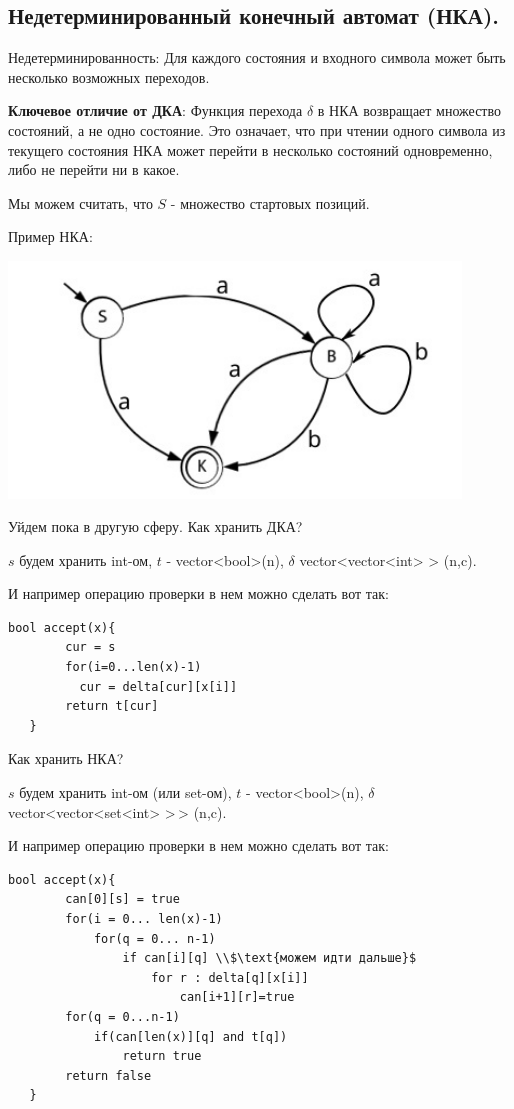 \subsection{Недетерминированный конечный автомат (НКА).}

Недетерминированность: Для каждого состояния и входного символа может быть несколько возможных переходов.

\textbf{Ключевое отличие от ДКА}: Функция перехода $\delta$ в НКА возвращает множество состояний, а не одно состояние. Это означает, что при чтении одного символа из текущего состояния НКА может перейти в несколько состояний одновременно, либо не перейти ни в какое.

Мы можем считать, что $S$ - множество стартовых позиций.

Пример НКА:
\begin{center}
    \includegraphics[width = 12cm]{assets/8_1_1.jpg}
\end{center}

Уйдем пока в другую сферу. Как хранить ДКА?

$s$ будем хранить int-ом, $t$ - vector<bool>(n), $\delta$ vector<vector<int> > (n,c). 

И например операцию проверки в нем можно сделать вот так:

\begin{lstlisting}[mathescape]
   bool accept(x){
        cur = s
        for(i=0...len(x)-1)
          cur = delta[cur][x[i]]
        return t[cur]
   }
\end{lstlisting}
Как хранить НКА?

$s$ будем хранить int-ом (или set-ом), $t$ - vector<bool>(n), $\delta$ vector<vector<set<int> >\,> (n,c). 

И например операцию проверки в нем можно сделать вот так:

\begin{lstlisting}[mathescape]
   bool accept(x){
        can[0][s] = true
        for(i = 0... len(x)-1)
            for(q = 0... n-1)
                if can[i][q] \\$\text{можем идти дальше}$
                    for r : delta[q][x[i]]
                        can[i+1][r]=true
        for(q = 0...n-1)
            if(can[len(x)][q] and t[q])
                return true
        return false
   }
\end{lstlisting}

